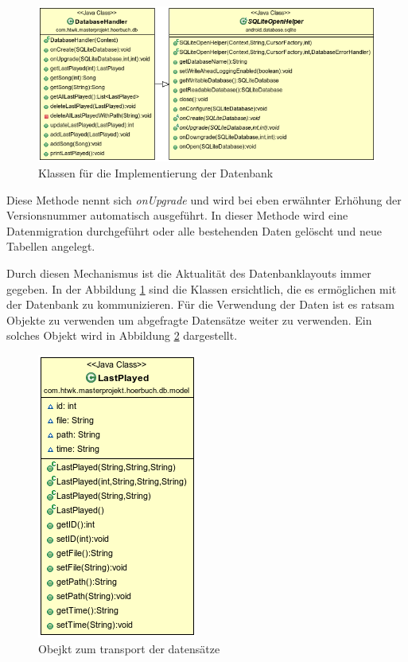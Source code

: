 \begin{figure}
\begin{center}
\includegraphics[scale=0.7]{images/database}
\caption{Klassen für die Implementierung der Datenbank}
\label{database}
\end{center}
\end{figure}

Diese Methode nennt sich \textit{onUpgrade} und wird bei eben erwähnter Erhöhung der Versionsnummer automatisch ausgeführt. In dieser Methode wird eine Datenmigration durchgeführt oder alle bestehenden Daten gelöscht und neue Tabellen angelegt.

Durch diesen Mechanismus ist die Aktualität des Datenbanklayouts immer gegeben. In der Abbildung \ref{database} sind die Klassen ersichtlich, die es ermöglichen mit der Datenbank zu kommunizieren. Für die Verwendung der Daten ist es ratsam Objekte zu verwenden um abgefragte Datensätze weiter zu verwenden. Ein solches Objekt wird in Abbildung \ref{dbmodel} dargestellt.

\begin{figure}
\begin{center}
\includegraphics[scale=0.7]{images/dbmodel}
\caption{Obejkt zum transport der datensätze}
\label{dbmodel}
\end{center}
\end{figure}

